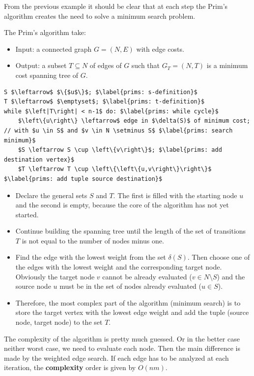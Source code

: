 \noindent
From the previous example it should be clear that at each step the Prim's algorithm creates the need to solve a minimum search problem.

\highspace
The Prim's algorithm take:
\begin{itemize}
    \item Input: a connected graph $G = \left(N,E\right)$ with edge costs.
    \item Output: a subset $T \subseteq N$ of edges of $G$ such that $G_{T} = \left(N,T\right)$ is a minimum cost spanning tree of $G$.
\end{itemize}

\begin{lstlisting}[language=pseudo-code, caption={Minimum spanning tree (MST) problem: Prim's $O\left(nm\right)$}]
S $\leftarrow$ $\{$u$\}$; $\label{prims: s-definition}$
T $\leftarrow$ $\emptyset$; $\label{prims: t-definition}$
while $\left|T\right| < n-1$ do: $\label{prims: while cycle}$
    $\left\{u\right\} \leftarrow$ edge in $\delta(S)$ of minimum cost; // with $u \in S$ and $v \in N \setminus S$ $\label{prims: search minimum}$
    $S \leftarrow S \cup \left\{v\right\}$; $\label{prims: add destination vertex}$
    $T \leftarrow T \cup \left\{\left\{u,v\right\}\right\}$ $\label{prims: add tuple source destination}$
\end{lstlisting}
\begin{itemize}
    \item[Rows \ref{prims: s-definition}-\ref{prims: t-definition}.] Declare the general sets $S$ and $T$. The first is filled with the starting node $u$ and the second is empty, because the core of the algorithm has not yet started.

    \item[Row \ref{prims: while cycle}.] Continue building the spanning tree until the length of the set of transitions $T$ is not equal to the number of nodes minus one.

    \item[Row \ref{prims: search minimum}.] Find the edge with the lowest weight from the set $\delta\left(S\right)$. Then choose one of the edges with the lowest weight and the corresponding target node. Obviously the target node $v$ cannot be already evaluated ($v \in N \setminus S$) and the source node $u$ must be in the set of nodes already evaluated ($u \in S$).
    
    \item[Rows \ref{prims: add destination vertex}-\ref{prims: add tuple source destination}.] Therefore, the most complex part of the algorithm (minimum search) is to store the target vertex with the lowest edge weight and add the tuple (source node, target node) to the set $T$.
\end{itemize}
The complexity of the algorithm is pretty much guessed. Or in the better case neither worst case, we need to evaluate each node. Then the main difference is made by the weighted edge search. If each edge has to be analyzed at each iteration, the \textbf{complexity} order is given by $O\left(nm\right)$.

